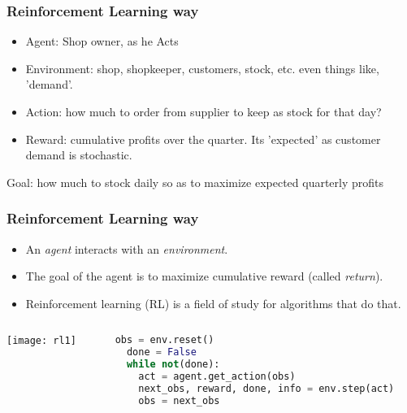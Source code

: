 \begin{frame}[fragile]\frametitle{Reinforcement Learning way}

\begin{itemize}
\item Agent: Shop owner, as he Acts
\item Environment: shop, shopkeeper, customers, stock, etc. even things like, 'demand'.
\item Action: how much to order from supplier to keep as stock for that day?
\item Reward: cumulative profits over the quarter. Its 'expected' as customer demand is stochastic.
\end{itemize}
Goal: how much to stock daily so as to maximize expected quarterly profits
\end{frame}


\begin{frame}[fragile]\frametitle{Reinforcement Learning way}

\begin{itemize}
\item An \textit{agent} interacts with an \textit{environment}. 
\item The goal of the agent is to maximize cumulative reward (called \textit{return}). 
\item Reinforcement learning (RL) is a field of study for algorithms that do that.
\end{itemize}

\begin{columns}
\begin{column}{0.5\textwidth}
    \begin{center}
     \texttt{[image: rl1]}
     \end{center}
\end{column}
\begin{column}{0.5\textwidth}  %
\begin{lstlisting}[language=python]
  obs = env.reset()
  done = False
  while not(done):
  	act = agent.get_action(obs)
  	next_obs, reward, done, info = env.step(act)
  	obs = next_obs
\end{lstlisting}
\end{column}
\end{columns}

\end{frame}

